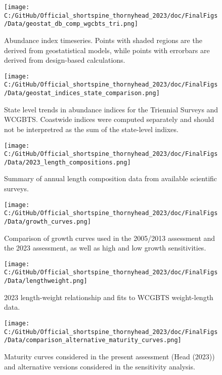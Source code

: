 \documentclass[11pt,
  letterpaper,
]{article}
\begin{document}
\begin{figure}
\centering
\texttt{[image: C:/GitHub/Official\_shortspine\_thornyhead\_2023/doc/FinalFigs/Data/geostat\_db\_comp\_wgcbts\_tri.png]}
\caption{Abundance index timeseries. Points with shaded regions are the derived from geostatistical models, while points with errorbars are derived from design-based calculations.\label{fig:modelbasedsurv}}
\end{figure}

\begin{figure}
\centering
\texttt{[image: C:/GitHub/Official\_shortspine\_thornyhead\_2023/doc/FinalFigs/Data/geostat\_indices\_state\_comparison.png]}
\caption{State level trends in abundance indices for the Triennial Surveys and WCGBTS. Coastwide indices were computed separately and should not be interpretred as the sum of the state-level indixes.\label{fig:state_indices}}
\end{figure}

\begin{figure}
\centering
\texttt{[image: C:/GitHub/Official\_shortspine\_thornyhead\_2023/doc/FinalFigs/Data/2023\_length\_compositions.png]}
\caption{Summary of annual length composition data from available scientific surveys.\label{fig:survey_comps}}
\end{figure}

\begin{figure}
\centering
\texttt{[image: C:/GitHub/Official\_shortspine\_thornyhead\_2023/doc/FinalFigs/Data/growth\_curves.png]}
\caption{Comparison of growth curves used in the 2005/2013 assessment and the 2023 assessment, as well as high and low growth sensitivities.\label{fig:growthcurve}}
\end{figure}

\begin{figure}
\centering
\texttt{[image: C:/GitHub/Official\_shortspine\_thornyhead\_2023/doc/FinalFigs/Data/lengthweight.png]}
\caption{2023 length-weight relationship and fits to WCGBTS weight-length data.\label{fig:lengthweight}}
\end{figure}

\begin{figure}
\centering
\texttt{[image: C:/GitHub/Official\_shortspine\_thornyhead\_2023/doc/FinalFigs/Data/comparison\_alternative\_maturity\_curves.png]}
\caption{Maturity curves considered in the present assessment (Head (2023)) and alternative versions considered in the sensitivity analysis.\label{fig:mat2}}
\end{figure}
\end{document}
